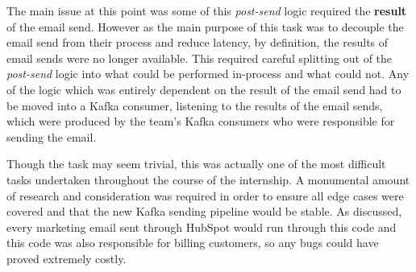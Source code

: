 The main issue at this point was some of this \textit{post-send} logic required the \textbf{result} of the email send. However as the main purpose of this task was to decouple the email send from their process and reduce latency, by definition, the results of email sends were no longer available. This required careful splitting out of the \textit{post-send} logic into what could be performed in-process and what could not. Any of the logic which was entirely dependent on the result of the email send had to be moved into a Kafka consumer, listening to the results of the email sends, which were produced by the \team{} team's Kafka consumers who were responsible for sending the email.

Though the task may seem trivial, this was actually one of the most difficult tasks undertaken throughout the course of the internship. A monumental amount of research and consideration was required in order to ensure all edge cases were covered and that the new Kafka sending pipeline would be stable. As discussed, every marketing email sent through HubSpot would run through this code and this code was also responsible for billing customers, so any bugs could have proved extremely costly.

